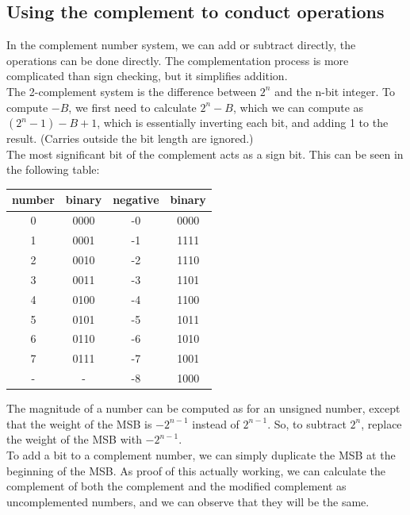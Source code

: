 \documentclass[nobib]{tufte-handout}
\begin{document}
\subsection{Using the complement to conduct operations}
In the complement number system, we can add or subtract directly, the
operations can be done directly. The complementation process is more
complicated than sign checking, but it simplifies addition.\\ The 2-complement
system is the difference between $2^n$ and the n-bit integer. To compute $-B$,
we first need to calculate $2^n-B$, which we can compute as $(2^n-1)-B+1$,
which is essentially inverting each bit, and adding 1 to the result. (Carries
outside the bit length are ignored.)\\ The most significant bit of the
complement acts as a sign bit. This can be seen in the following table:
\begin{table}
    \centering
    \begin{tabular}{c c|c c}
        number & binary & negative & binary \\
        \hline
        0      & 0000   & -0       & 0000   \\
        1      & 0001   & -1       & 1111   \\
        2      & 0010   & -2       & 1110   \\
        3      & 0011   & -3       & 1101   \\
        4      & 0100   & -4       & 1100   \\
        5      & 0101   & -5       & 1011   \\
        6      & 0110   & -6       & 1010   \\
        7      & 0111   & -7       & 1001   \\
        -      & -      & -8       & 1000   \\

    \end{tabular}
\end{table}
The magnitude of a number can be computed as for an unsigned number, except that the weight of the MSB is $-2^{n-1}$ instead of $2^{n-1}$. So, to subtract $2^n$, replace the weight of the MSB with $-2^{n-1}$.\\
To add a bit to a complement number, we can simply duplicate the MSB at the beginning of the MSB.
As proof of this actually working, we can calculate the complement of both the complement and the modified complement as uncomplemented numbers, and we can observe that they will be the same.\\
\end{document}
